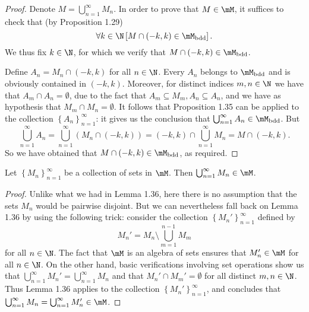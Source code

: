 \documentclass[pmath450]{subfiles}
\begin{document}
    \begin{proof}
        Denote $M=\bigcup^{\infty}_{n=1}M_n$. In order to prove that $M\in\mM$, it suffices to check that (by Proposition 1.29)
        \begin{equation}
            \forall k\in\N\left[ M\cap\left( -k,k \right)\in\mM_{\bdd} \right].
        \end{equation}
        We thus fix $k\in\N$, for which we verify that $M\cap\left( -k,k \right)\in\mM_{\bdd}$.

        Define $A_n=M_n\cap\left( -k,k \right)$ for all $n\in\N$. Every $A_n$ belongs to $\mM_{\bdd}$ and is obviously contained in $\left( -k,k \right)$. Moreover, for distinct indices $m,n\in\N$ we have that $A_m\cap A_n=\emptyset$, due to the fact that $A_m\subseteq M_m, A_n\subseteq A_n$, and we have as hypothesis that $M_m\cap M_n=\emptyset$. It follows that Proposition 1.35 can be applied to the collection $\left\lbrace A_n \right\rbrace^{\infty}_{n=1}$: it gives us the conclusion that $\bigcup^{\infty}_{n=1}A_n\in\mM_{\bdd}$. But
        \begin{equation*}
            \bigcup^{\infty}_{n=1}A_n = \bigcup^{\infty}_{n=1} \left( M_n\cap \left( -k,k \right) \right) = \left( -k,k \right)\cap \bigcup^{\infty}_{n=1}M_n = M\cap\left( -k,k \right).
        \end{equation*}
        So we have obtained that $M\cap\left( -k,k \right)\in\mM_{\bdd}$, as required.
    \end{proof}

    \begin{prop}{}
        Let $\left\lbrace M_n \right\rbrace^{\infty}_{n=1}$ be a collection of sets in $\mM$. Then $\bigcup^{\infty}_{n=1}M_n\in\mM$.
    \end{prop}

    \begin{proof}
        Unlike what we had in Lemma 1.36, here there is no assumption that the sets $M_n$ would be pairwise disjoint. But we can nevertheless fall back on Lemma 1.36 by using the following trick: consider the collection $\left\lbrace M_n' \right\rbrace^{\infty}_{n=1}$ defined by
        \begin{equation*}
            M_n' = M_n\setminus \bigcup^{n-1}_{m=1}M_m
        \end{equation*}
        for all $n\in\N$. The fact that $\mM$ is an algebra of sets ensures that $M_n'\in\mM$ for all $n\in\N$. On the other hand, basic verifications involving set operations show us that $\bigcup^{\infty}_{n=1}M_n'=\bigcup^{\infty}_{n=1}M_n$ and that $M_n'\cap M_m'=\emptyset$ for all distinct $m,n\in\N$. Thus Lemma 1.36 applies to the collection $\left\lbrace M_n' \right\rbrace^{\infty}_{n=1}$, and concludes that $\bigcup^{\infty}_{n=1}M_n=\bigcup^{\infty}_{n=1}M_n'\in\mM$.
    \end{proof}
\end{document}
